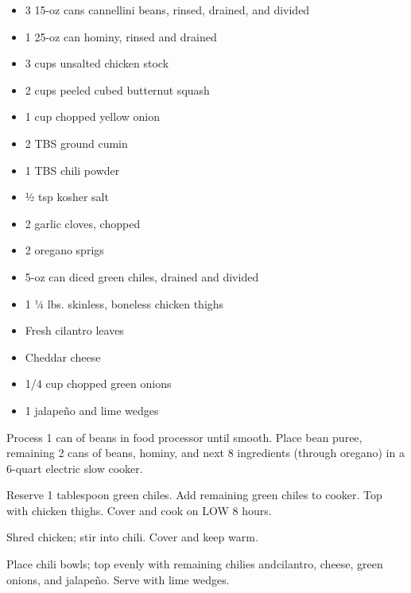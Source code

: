 
\ingredients
\begin{itemize}
\item
  3 15-oz cans cannellini beans, rinsed, drained, and divided
\item
  1 25-oz can hominy, rinsed and drained
\item
  3 cups unsalted chicken stock
\item
  2 cups peeled cubed butternut squash
\item
  1 cup chopped yellow onion
\item
  2 TBS ground cumin
\item
  1 TBS chili powder
\item
  ½ tsp kosher salt
\item
  2 garlic cloves, chopped
\item
  2 oregano sprigs
\item
  5-oz can diced green chiles, drained and divided
\item
  1 ¼ lbs. skinless, boneless chicken thighs
\item
  Fresh cilantro leaves
\item
  Cheddar cheese
\item
  1/4 cup chopped green onions
\item
  1 jalapeño and lime wedges
\end{itemize}

\instructions
Process 1 can of beans in food processor until smooth. Place bean puree,
remaining 2 cans of beans, hominy, and next 8 ingredients (through
oregano) in a 6-quart electric slow cooker.

Reserve 1 tablespoon green chiles. Add remaining green chiles to cooker.
Top with chicken thighs. Cover and cook on LOW 8 hours.

Shred chicken; stir into chili. Cover and keep warm.

Place chili bowls; top evenly with remaining chilies andcilantro,
cheese, green onions, and jalapeño. Serve with lime wedges.
